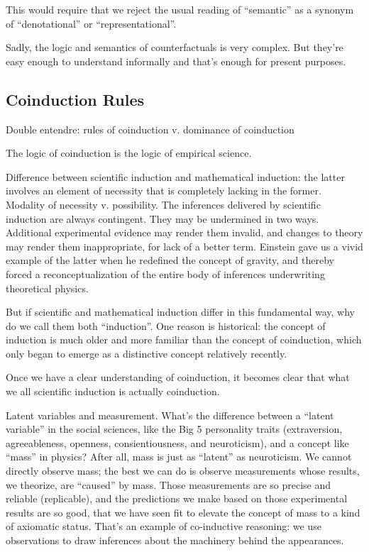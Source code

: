 \documentclass{article}
\begin{document}
This would require that we reject the usual reading of ``semantic'' as a
synonym of ``denotational'' or ``representational''.

Sadly, the logic and semantics of counterfactuals is very complex. But
they're easy enough to understand informally and that's enough for
present purposes.

 \cite{sep-counterfactuals}



\subsection{Coinduction Rules}

Double entendre: rules of coinduction v. dominance of coinduction

The logic of coinduction is the logic of empirical science.

Difference between scientific induction and mathematical induction:
the latter involves an element of necessity that is completely lacking
in the former. Modality of necessity v. possibility. The inferences
delivered by scientific induction are always contingent. They may be
undermined in two ways. Additional experimental evidence may render
them invalid, and changes to theory may render them inappropriate, for
lack of a better term. Einstein gave us a vivid example of the latter
when he redefined the concept of gravity, and thereby forced a
reconceptualization of the entire body of inferences underwriting
theoretical physics.

But if scientific and mathematical induction differ in this
fundamental way, why do we call them both ``induction''. One reason is
historical: the concept of induction is much older and more familiar
than the concept of coinduction, which only began to emerge as a
distinctive concept relatively recently.

Once we have a clear understanding of coinduction, it becomes clear
that what we all scientific induction is actually coinduction.

Latent variables and measurement. What's the difference between a
``latent variable'' in the social sciences, like the Big 5 personality
traits (extraversion, agreeableness, openness, consientiousness, and
neuroticism), and a concept like ``mass'' in physics? After all, mass
is just as ``latent'' as neuroticism. We cannot directly observe mass;
the best we can do is observe measurements whose results, we theorize,
are ``caused'' by mass. Those measurements are so precise and reliable
(replicable), and the predictions we make based on those experimental
results are so good, that we have seen fit to elevate the concept of
mass to a kind of axiomatic status. That's an example of co-inductive
reasoning: we use observations to draw inferences about the machinery
behind the appearances.
\end{document}
